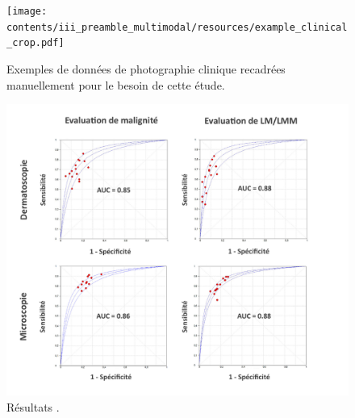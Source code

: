 
\begin{figure}[H]
    \begin{center}
        \texttt{[image: contents/iii\_preamble\_multimodal/resources/example\_clinical\_crop.pdf]}
        \caption{Exemples de données de photographie clinique recadrées manuellement pour le besoin de cette étude.}
        \label{fig:example_clinical_crop}
    \end{center} 
\end{figure}\par

\begin{figure}[H]
    \begin{center}
        \includegraphics[width=\linewidth]{contents/iii_preamble_multimodal/resources/results_roc_experts.pdf}
        \caption{Résultats .}
        \label{fig:results_roc_experts}
    \end{center} 
\end{figure}\par
 
